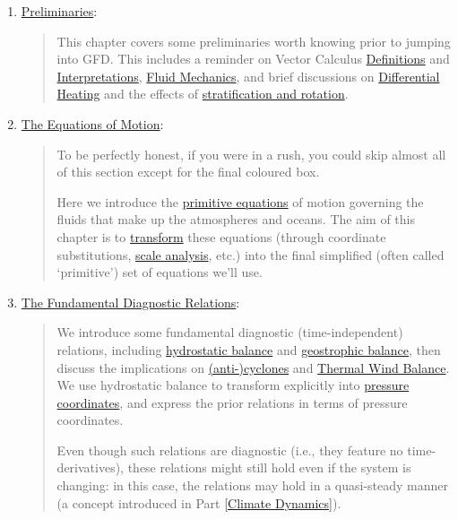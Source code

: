 \begin{enumerate}
    \item \hyperref[Prelim GFD]{Preliminaries}: 
        
        \begin{quote}
            This chapter covers some preliminaries worth knowing prior to jumping into GFD. This includes a reminder on Vector Calculus \hyperref[VC box]{Definitions} and \hyperref[VC Interp]{Interpretations}, \hyperref[Fluid Mechanics Box]{Fluid Mechanics}, and brief discussions on \hyperref[Differential Heating]{Differential Heating} and the effects of \hyperref[GFD Special]{stratification and rotation}.
        \end{quote} 

    \item \hyperref[EoM GFD]{The Equations of Motion}: 
    
        \begin{quote}
            To be perfectly honest, if you were in a rush, you could skip almost all of this section except for the final coloured box. 
            
            Here we introduce the \hyperref[EoM GFD]{primitive equations} of motion governing the fluids that make up the atmospheres and oceans. The aim of this chapter is to \hyperref[s Transforming EoM]{transform} these equations (through coordinate substitutions, \hyperref[Scale Analysis]{scale analysis}, etc.) into the final simplified (often called `primitive') set of equations we'll use.
        \end{quote}
    
    \item \hyperref[Dia Relations]{The Fundamental Diagnostic Relations}:
        
        \begin{quote}
            We introduce some fundamental diagnostic (time-independent) relations, including \hyperref[Hydrostatic GFD Box]{hydrostatic balance} and \hyperref[Geostrophic Box]{geostrophic balance}, then discuss the implications on \hyperref[Cyclones]{(anti-)cyclones} and \hyperref[s Thermal Wind]{Thermal Wind Balance}. We use hydrostatic balance to transform explicitly into \hyperref[Pressure Coords]{pressure coordinates}, and express the prior relations in terms of pressure coordinates.
            
            Even though such relations are diagnostic (i.e., they feature no time-derivatives), these relations might still hold even if the system is changing: in this case, the relations may hold in a quasi-steady manner (a concept introduced in Part \ref{Climate Dynamics}).
        \end{quote}
    

\end{enumerate}
